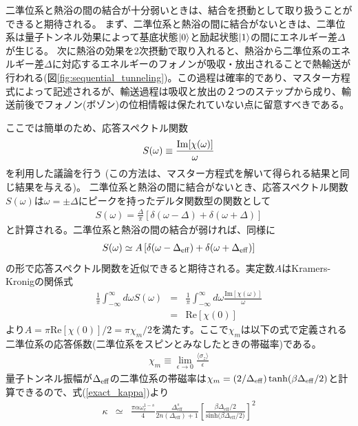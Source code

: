 二準位系と熱浴の間の結合が十分弱いときは、結合を摂動として取り扱うことができると期待される。
まず、二準位系と熱浴の間に結合がないときは、二準位系は量子トンネル効果によって基底状態$\ket{0}$と励起状態$\ket{1}$の間にエネルギー差$\Delta$が生じる。
次に熱浴の効果を2次摂動で取り入れると、熱浴から二準位系のエネルギー差$\Delta$に対応するエネルギーのフォノンが吸収・放出されることで熱輸送が行われる(図\ref{fig:sequential_tunneling})。この過程は確率的であり、マスター方程式によって記述される\cite{Ruokola11}が、輸送過程は吸収と放出の２つのステップから成り、輸送前後でフォノン(ボゾン)の位相情報は保たれていない点に留意すべきである。

ここでは簡単のため、応答スペクトル関数
\begin{eqnarray}
S(\omega) \equiv \frac{{\rm Im}[\chi(\omega)]}{\omega}
\end{eqnarray}
を利用した議論を行う
(この方法は、マスター方程式を解いて得られる結果と同じ結果を与える)。
二準位系と熱浴の間に結合がないとき、応答スペクトル関数$S(\omega)$は$\omega=\pm\Delta$にピークを持ったデルタ関数型の関数として
\begin{eqnarray}
	S(\omega) = \frac{\Delta}{\pi} \left[\delta(\omega-\Delta)+\delta(\omega+\Delta) \right]
\end{eqnarray}
と計算される。二準位系と熱浴の間の結合が弱ければ、同様に
\begin{eqnarray}
	S(\omega) \simeq A \left[\delta(\omega-\Delta_{\rm eff})+\delta(\omega+\Delta_{\rm eff})\right]
\end{eqnarray}
の形で応答スペクトル関数を近似できると期待される。実定数$A$はKramers-Kronigの関係式
\begin{eqnarray}
	\frac{1}{\pi}\int_{-\infty}^{\infty}d\omega S(\omega)&=&\frac{1}{\pi}\int_{-\infty}^{\infty}d\omega \frac{\mathrm{Im}[\chi(\omega)]}{\omega}\\
&=&\mathrm{Re}[\chi(0)]
	\label{Kramers-Kronig}
\end{eqnarray}
より$A=\pi\mathrm{Re}[\chi(0)]/2=\pi\chi_m/2$を満たす。ここで$\chi_m$は以下の式で定義される
二準位系の応答係数(二準位系をスピンとみなしたときの帯磁率)である。
\begin{eqnarray}
\chi_m \equiv \lim_{\epsilon \rightarrow 0} \frac{\langle \sigma_z \rangle}{\epsilon}
\label{chimdef}
\end{eqnarray}
量子トンネル振幅が$\Delta_{\rm eff}$の二準位系の帯磁率は$\chi_m = (2/\Delta_{\rm eff}) \tanh(\beta \Delta_{\rm eff}/2)$と計算できるので、式(\ref{exact_kappa})より
\begin{eqnarray}
	\kappa&\simeq& \frac{\pi\alpha\omega_c^{1-s}}{4}\frac{ \Delta_{\mathrm{eff}}^{s}}{2n(\Delta_{\mathrm{eff}})+1}\left[\frac{\beta\Delta_{\mathrm{eff}}/2}{\mathrm{sinh}{(\beta\Delta_{\mathrm{eff}}/2})}\right]^{2}
	\label{compare_ruokola2}
\end{eqnarray}
